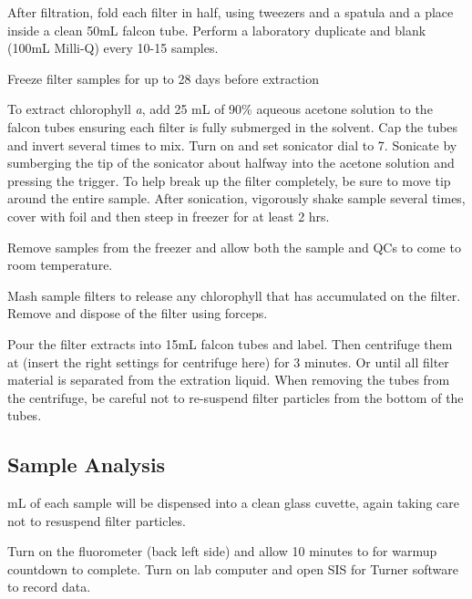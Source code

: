\documentclass[12pt]{../SOP3_alpha}
\begin{document}
\NP After filtration, fold each filter in half, using tweezers and a spatula and a place inside a clean 50mL falcon tube. Perform a laboratory duplicate and blank (100mL Milli-Q) every 10-15 samples.

\NP Freeze filter samples for up to 28 days before extraction

\NP To extract chlorophyll \textit{a}, add 25 mL of 90\% aqueous acetone solution to the falcon tubes ensuring each filter is fully submerged in the solvent. Cap the tubes and invert several times to mix. Turn on and set sonicator dial to 7. Sonicate by sumberging the tip of the sonicator about halfway into the acetone solution and pressing the trigger. To help break up the filter completely, be sure to move tip around the entire sample. After sonication, vigorously shake sample several times, cover with foil and then steep in freezer for at least 2 hrs.

\NP Remove samples from the freezer and allow both the sample and QCs to come to room temperature. 

\NP Mash sample filters to release any chlorophyll that has accumulated on the filter. Remove and dispose of the filter using forceps.

\NP Pour the filter extracts into 15mL falcon tubes and label. Then centrifuge them at (insert the right settings for centrifuge here) for 3 minutes. Or until all filter material is separated from the extration liquid. When removing the tubes from the centrifuge, be careful not to re-suspend filter particles from the bottom of the tubes.


\subsection*{Sample Analysis}

 mL of each sample will be dispensed into a clean glass cuvette, again taking care not to resuspend filter particles.

\NP Turn on the fluorometer (back left side) and allow 10 minutes to for warmup countdown to complete. Turn on lab computer and open SIS for Turner software to record data. 
\end{document}
